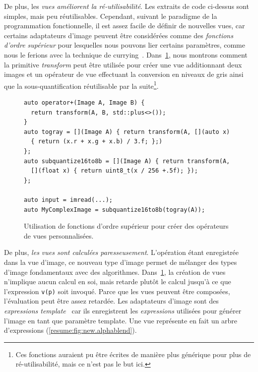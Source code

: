De plus, les \emph{vues améliorent la ré-utilisabilité}. Les extraits de code ci-dessus sont simples, mais peu
réutilisables. Cependant, suivant le paradigme de la programmation fonctionnelle, il est assez facile de définir de
nouvelles vues, car certains adaptateurs d'image peuvent être considérées comme des \emph{fonctions d'ordre supérieur}
pour lesquelles nous pouvons lier certains paramètres, comme nous le ferions avec la technique de
currying~\parencite{hanus.1995.curry}. Dans~\cref{resume:fig:view.highorder}, nous montrons comment la primitive
\emph{transform} peut être utilisée pour créer une vue additionnant deux images et un opérateur de vue effectuant la
conversion en niveaux de gris ainsi que la sous-quantification réutilisable par la suite\footnote{Ces fonctions auraient
  pu être écrites de manière plus générique pour plus de ré-utilisabilité, mais ce n'est pas le but ici.}.

\begin{figure}
  \begin{verbatim}
auto operator+(Image A, Image B) {
  return transform(A, B, std::plus<>());
}
auto togray = [](Image A) { return transform(A, [](auto x)
  { return (x.r + x.g + x.b) / 3.f; };)
};
auto subquantize16to8b = [](Image A) { return transform(A,
  [](float x) { return uint8_t(x / 256 +.5f); });
};

auto input = imread(...);
auto MyComplexImage = subquantize16to8b(togray(A));
  \end{verbatim}

  \caption[]{Utilisation de fonctions d'ordre supérieur pour créer des opérateurs de vues personnalisées.}
  \label{resume:fig:view.highorder}
\end{figure}

De plus, \emph{les vues sont calculées paresseusement}. L'opération étant enregistrée dans la vue d'image, ce nouveau
type d'image permet de mélanger des types d'image fondamentaux avec des algorithmes.
Dans~\cref{resume:fig:view.highorder}, la création de vues n'implique aucun calcul en soi, mais retarde plutôt le calcul
jusqu'à ce que l'expression \texttt{v(p)} soit invoqué. Parce que les vues peuvent être composées, l'évaluation peut
être assez retardée. Les adaptateurs d'image sont des \emph{expressions template}~\parencite{veldhuizen.1995.expression,
  veldhuizen.2000.blitz} car ils enregistrent les \emph{expressions} utilisées pour générer l'image en tant que paramètre
template. Une vue représente en fait un arbre d'expressions (\cref{resume:fig:new.alphablend}).

